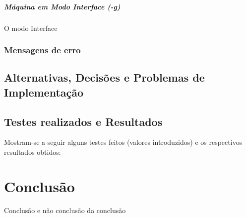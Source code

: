 \documentclass{report}
\begin{document}
\paragraph{\quad Máquina em Modo Interface (-g)}
  O modo Interface
\subsection{Mensagens de erro}
\section{Alternativas, Decisões e Problemas de Implementação}
\section{Testes realizados e Resultados}
Mostram-se a seguir alguns testes feitos (valores introduzidos) e
os respectivos resultados obtidos:

\chapter{Conclusão} \label{concl}
Conclusão e não conclusão da conclusão



\end{document}
